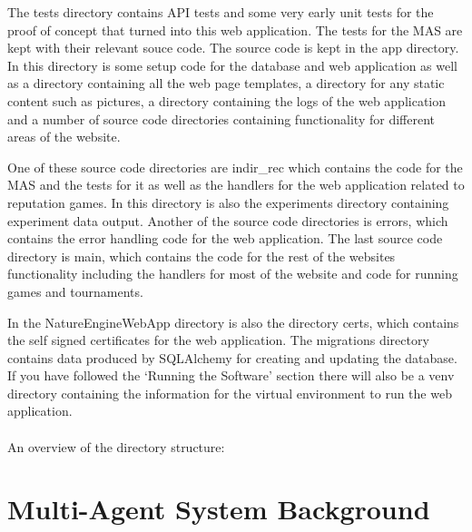 \documentclass[]{final_report}
\begin{document}
The tests directory contains API tests and some very early unit tests for the proof of concept that turned into this web application. The tests for the MAS are kept with their relevant souce code. The source code is kept in the app directory. In this directory is some setup code for the database and web application as well as a directory containing all the web page templates, a directory for any static content such as pictures, a directory containing the logs of the web application and a number of source code directories containing functionality for different areas of the website.\par 
One of these source code directories are indir\_rec which contains the code for the MAS and the tests for it as well as the handlers for the web application related to reputation games. In this directory is also the experiments directory containing experiment data output. Another of the source code directories is errors, which contains the error handling code for the web application. The last source code directory is main, which contains the code for the rest of the websites functionality including the handlers for most of the website and code for running games and tournaments.\par 
In the NatureEngineWebApp directory is also the directory certs, which contains the self signed certificates for the web application. The migrations directory contains data produced by SQLAlchemy for creating and updating the database. If you have followed the `Running the Software' section there will also be a venv directory containing the information for the virtual environment to run the web application.\\\\
An overview of the directory structure:\\

\section{Multi-Agent System Background}
\end{document}
